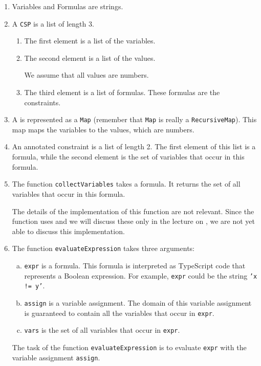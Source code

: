 \begin{enumerate}
\item Variables and Formulas are strings.  
\item A \texttt{CSP} is a list of length 3.
  \begin{enumerate}
  \item The first element is a list of the variables.  
  \item The second element is a list of the values.

        We assume that all values are numbers.
  \item The third element is a list of formulas.
        These formulas are the constraints.
  \end{enumerate}
\item A  is represented as a \texttt{Map} (remember that \texttt{Map} is really a
      \texttt{RecursiveMap}).  This map maps the variables to the values, which are numbers.
\item An annotated constraint is a list of length 2.  The first element of this list is a formula, while the
      second element is the set of variables that occur in this formula.
\item The function \texttt{collectVariables} takes a formula.  It returns the
      set of all variables that occur in this formula.

      The details of the implementation of this function are not relevant.  Since the function uses
       and we will discuss these only in the lecture on ,
      we are not yet able to discuss this implementation.
\item The function \texttt{evaluateExpression} takes three arguments:
  \begin{enumerate}[(a)]
  \item \texttt{expr} is a formula.  This formula is interpreted as TypeScript code that represents a Boolean
        expression.  For example, \texttt{expr} could be the string \texttt{'x != y'}.
  \item \texttt{assign} is a variable assignment.  The domain of this variable assignment is guaranteed to
        contain all the variables that occur in \texttt{expr}.    
  \item \texttt{vars} is the set of all variables that occur in \texttt{expr}.
  \end{enumerate}
  The task of the function \texttt{evaluateExpression} is to evaluate \texttt{expr} with the variable
  assignment \texttt{assign}.


\end{enumerate}

